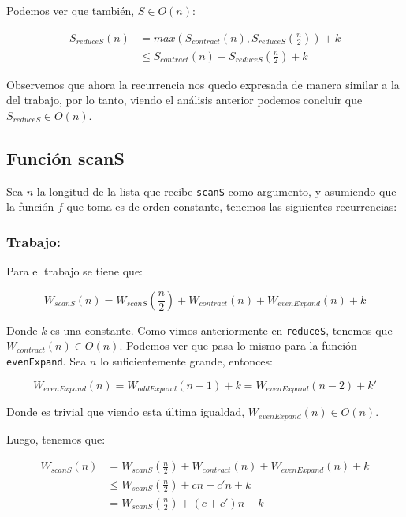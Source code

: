 \documentclass[11pt]{article}
\begin{document}
Podemos ver que también, $S \in O(n)$:

\begin{align*}
    S_{reduceS}(n) & = max(S_{contract}(n), S_{reduceS}(\frac{n}{2})) + k \\
                   & \leq S_{contract}(n) + S_{reduceS}(\frac{n}{2}) + k
\end{align*}

Observemos que ahora la recurrencia nos quedo expresada de manera similar
a la del trabajo, por lo tanto, viendo el análisis anterior podemos 
concluir que $S_{reduceS} \in O(n)$.


\subsection{Función scanS}

Sea $n$ la longitud de la lista que recibe \texttt{scanS} como argumento, y
asumiendo que la función $f$ que toma es de orden constante, tenemos las
siguientes recurrencias:

\subsubsection{Trabajo:}

Para el trabajo se tiene que:

\begin{equation*}
    W_{scanS}(n) = W_{scanS}(\frac{n}{2}) + W_{contract}(n) + W_{evenExpand}(n) + k
\end{equation*}

Donde $k$ es una constante. Como vimos anteriormente en \texttt{reduceS}, tenemos que
$W_{contract}(n) \in O(n)$. Podemos ver que pasa lo mismo para la función \texttt{evenExpand}. 
Sea $n$ lo suficientemente grande, entonces:

\begin{equation*}
    W_{evenExpand}(n) = W_{oddExpand}(n - 1) + k = W_{evenExpand}(n - 2) + k'
\end{equation*}

Donde es trivial que viendo esta última igualdad, $W_{evenExpand}(n) \in O(n)$.

Luego, tenemos que:

\begin{align*}
    W_{scanS}(n) & = W_{scanS}(\frac{n}{2}) + W_{contract}(n) + W_{evenExpand}(n) + k \\
                 & \leq W_{scanS}(\frac{n}{2}) + cn + c'n + k \\
                 & = W_{scanS}(\frac{n}{2}) + (c + c')n + k
\end{align*}
\end{document}
